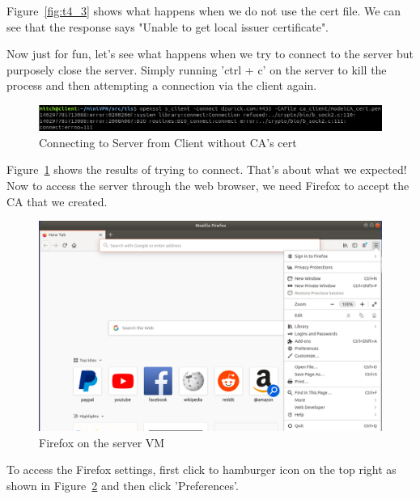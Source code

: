 \documentclass[12pt]{article}
\newcommand\tab[1][0.5cm]{\hspace*{#1}}
\begin{document}
\tab Figure~\ref{fig:t4_3} shows what happens when we do not use the cert file. We can see that the response says "Unable to get local issuer certificate".

\tab Now just for fun, let's see what happens when we try to connect to the server but purposely close the server. Simply running 'ctrl + c' on the server to kill the process and then attempting a connection via the client again.

    \begin{figure}[H]
        \begin{center}
            \includegraphics[scale=0.6]{t4_connect_no_server_up.PNG}
        \end{center}{}
        \caption{Connecting to Server from Client without CA's cert}
        \label{fig:t4_connect_no_server_up}
    \end{figure}

\tab Figure~\ref{fig:t4_connect_no_server_up} shows the results of trying to connect. That's about what we expected! Now to access the server through the web browser, we need Firefox to accept the CA that we created.

    \begin{figure}[H]
        \begin{center}
            \includegraphics[scale=0.5]{t4_4.png}
        \end{center}{}
        \caption{Firefox on the server VM}
        \label{fig:t4_4}
    \end{figure}

\tab To access the Firefox settings, first click to hamburger icon on the top right as shown in Figure~\ref{fig:t4_4} and then click 'Preferences'.
\end{document}

